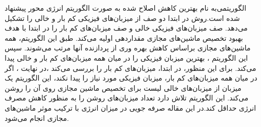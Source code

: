الگوریتمی‌به نام  بهترین کاهش اصلاح شده 
 به صورت الگوریتم انرژی محور
 پیشنهاد شده است.روش 
 در ابتدا دو صف از میزبان‌های فیزیکی کم بار و خالی را تشکیل می‌دهد. صف میزبان‌های فیزیکی خالی و صف میزبان‌های کم بار را در ابتدا با هدف بهبود تخصیص ماشین‌های مجازی مقداردهی اولیه می‌کند. طبق این الگوریتم، همه ماشین‌های مجازی براساس کاهش بهره وری از پردازنده آنها  مرتب می‌شوند. سپس این الگوریتم ، بهترین میزبان فیزیکی را در میان همه میزبان‌های کم بار و خالی پیدا می‌کند. برای این منظور، در ابتدا، میزبان‌های کم بار را بررسی می‌کند ،در نهایت ،  اگر در میان همه میزبان‌های کم بار، میزبان فیزیکی مورد نیاز را  پیدا نکند، این الگوریتم یک میزبان از میزبان‌های خالی لیست برای تخصیص ماشین مجازی روی آن را روشن می‌کند. این الگوریتم تلاش دارد تعداد میزبان‌های روشن را به منظور کاهش مصرف انرژی حداقل کند.در این مقاله صرفه جویی در میزان انرژی با ترکیب موثر ماشین‌های مجازی انجام می‌شود. 
